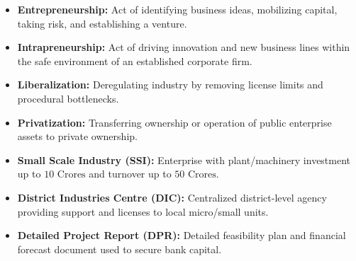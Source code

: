 \documentclass[12pt,a4paper]{article}
\begin{document}
\begin{tcolorbox}[defbox, title={\textbf{One-Line Definitions}}]
\begin{itemize}[leftmargin=*, itemsep=2.5pt, topsep=0pt]
  \item \textbf{Entrepreneurship:} Act of identifying business ideas, mobilizing capital, taking risk, and establishing a venture.
  \item \textbf{Intrapreneurship:} Act of driving innovation and new business lines within the safe environment of an established corporate firm.
  \item \textbf{Liberalization:} Deregulating industry by removing license limits and procedural bottlenecks.
  \item \textbf{Privatization:} Transferring ownership or operation of public enterprise assets to private ownership.
  \item \textbf{Small Scale Industry (SSI):} Enterprise with plant/machinery investment up to $10 \text{ Crores}$ and turnover up to $50 \text{ Crores}$.
  \item \textbf{District Industries Centre (DIC):} Centralized district-level agency providing support and licenses to local micro/small units.
  \item \textbf{Detailed Project Report (DPR):} Detailed feasibility plan and financial forecast document used to secure bank capital.
\end{itemize}
\end{tcolorbox}
\end{document}
